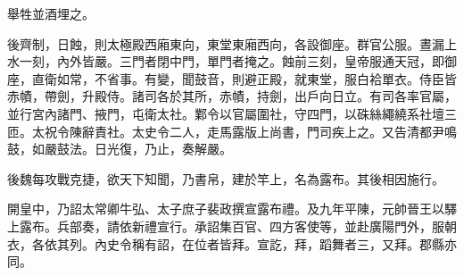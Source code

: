 \begin{pinyinscope}
 舉牲並酒埋之。



 後齊制，日蝕，則太極殿西廂東向，東堂東廂西向，各設御座。群官公服。晝漏上水一刻，內外皆嚴。三門者閉中門，單門者掩之。蝕前三刻，皇帝服通天冠，即御座，直衛如常，不省事。有變，聞鼓音，則避正殿，就東堂，服白袷單衣。侍臣皆赤幘，帶劍，升殿侍。諸司各於其所，赤幘，持劍，出戶向日立。有司各率官屬，並行宮內諸門、掖門，屯衛太社。鄴令以官屬圍社，守四門，以硃絲繩繞系社壇三匝。太祝令陳辭責社。太史令二人，走馬露版上尚書，門司疾上之。又告清都尹鳴鼓，如嚴鼓法。日光復，乃止，奏解嚴。



 後魏每攻戰克捷，欲天下知聞，乃書帛，建於竿上，名為露布。其後相因施行。



 開皇中，乃詔太常卿牛弘、太子庶子裴政撰宣露布禮。及九年平陳，元帥晉王以驛上露布。兵部奏，請依新禮宣行。承詔集百官、四方客使等，並赴廣陽門外，服朝衣，各依其列。內史令稱有詔，在位者皆拜。宣訖，拜，蹈舞者三，又拜。郡縣亦同。



\end{pinyinscope}